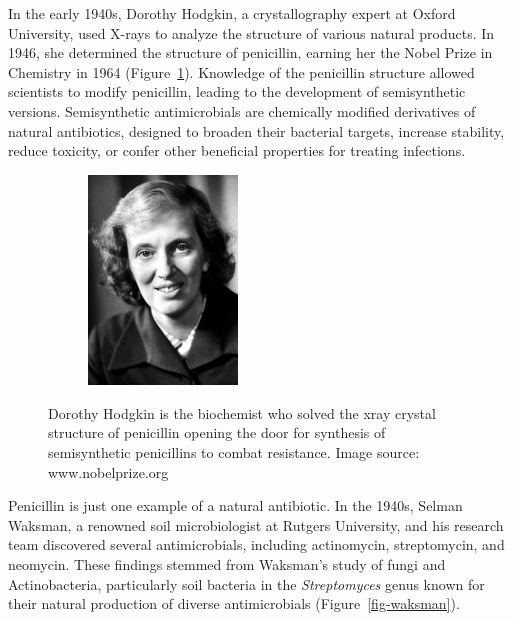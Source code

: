 \documentclass[
  letterpaper,
  DIV=11,
  numbers=noendperiod]{scrreprt}
\begin{document}
In the early 1940s, Dorothy Hodgkin, a crystallography expert at Oxford
University, used X-rays to analyze the structure of various natural
products. In 1946, she determined the structure of penicillin, earning
her the Nobel Prize in Chemistry in 1964 (Figure~\ref{fig-hodgkin}).
Knowledge of the penicillin structure allowed scientists to modify
penicillin, leading to the development of semisynthetic versions.
Semisynthetic antimicrobials are chemically modified derivatives of
natural antibiotics, designed to broaden their bacterial targets,
increase stability, reduce toxicity, or confer other beneficial
properties for treating infections.

\begin{figure}

{\centering 

\begin{figure}

{\centering \includegraphics[width=1.5625in,height=\textheight]{images/hodgkin.png}

}

\end{figure}

}

\caption{\label{fig-hodgkin}Dorothy Hodgkin is the biochemist who solved
the xray crystal structure of penicillin opening the door for synthesis
of semisynthetic penicillins to combat resistance. Image source:
www.nobelprize.org}

\end{figure}

Penicillin is just one example of a natural antibiotic. In the 1940s,
Selman Waksman, a renowned soil microbiologist at Rutgers University,
and his research team discovered several antimicrobials, including
actinomycin, streptomycin, and neomycin. These findings stemmed from
Waksman's study of fungi and Actinobacteria, particularly soil bacteria
in the \emph{Streptomyces} genus known for their natural production of
diverse antimicrobials (Figure~\ref{fig-waksman}).
\end{document}
